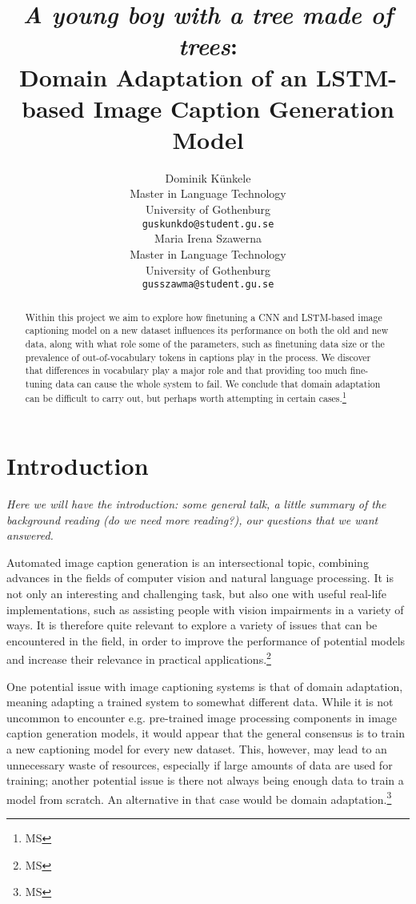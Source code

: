 \documentclass[11pt]{article}
\title{\textit{A young boy with a tree made of trees}: \\ Domain Adaptation of an LSTM-based Image Caption Generation Model}
\author{Dominik Künkele \\
  Master in Language Technology \\
  University of Gothenburg \\
  \texttt{guskunkdo@student.gu.se} \\\And
  Maria Irena Szawerna \\
  Master in Language Technology \\
  University of Gothenburg \\
  \texttt{gusszawma@student.gu.se} \\}
\begin{document}
\maketitle
\begin{abstract}

Within this project we aim to explore how finetuning a CNN and LSTM-based image captioning model on a new dataset influences its performance on both the old and new data, along with what role some of the parameters, such as finetuning data size or the prevalence of out-of-vocabulary tokens in captions play in the process. We discover that differences in vocabulary play a major role and that providing too much fine-tuning data can cause the whole system to fail. We conclude that domain adaptation can be difficult to carry out, but perhaps worth attempting in certain cases.\footnote{MS} 

\end{abstract}

\section{Introduction}

\textit{Here we will have the introduction: some general talk, a little summary of the background reading (do we need more reading?), our questions that we want answered.}

Automated image caption generation is an intersectional topic, combining advances in the fields of computer vision and natural language processing. It is not only an interesting and challenging task, but also one with useful real-life implementations, such as assisting people with vision impairments in a variety of ways. It is therefore quite relevant to explore a variety of issues that can be encountered in the field, in order to improve the performance of potential models and increase their relevance in practical applications.\footnote{MS}

One potential issue with image captioning systems is that of domain adaptation, meaning adapting a trained system to somewhat different data. While it is not uncommon to encounter e.g. pre-trained image processing components in image caption generation models, it would appear that the general consensus is to train a new captioning model for every new dataset. This, however, may lead to an unnecessary waste of resources, especially if large amounts of data are used for training; another potential issue is there not always being enough data to train a model from scratch. An alternative in that case would be domain adaptation.\footnote{MS}
\end{document}
